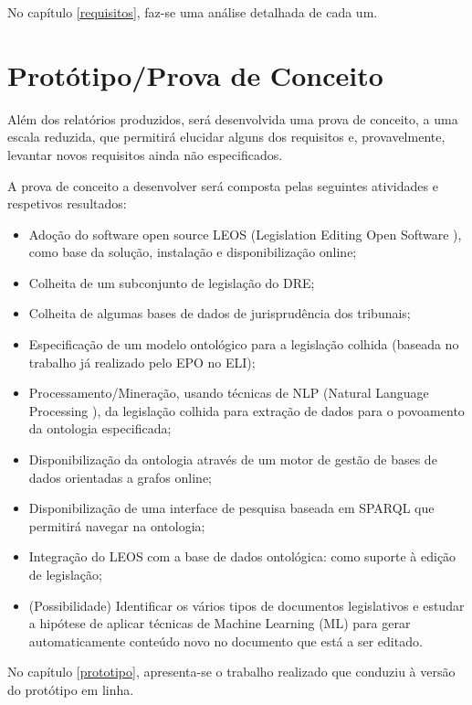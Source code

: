 No capítulo \ref{requisitos}, faz-se uma análise detalhada de cada um.


\section{Protótipo/Prova de Conceito}

Além dos relatórios produzidos, será desenvolvida uma prova de conceito, a uma escala
reduzida, que permitirá elucidar alguns dos requisitos e, provavelmente, levantar novos requisitos ainda
não especificados.

A prova de conceito a desenvolver será composta pelas seguintes atividades e respetivos
resultados:

\begin{itemize}
\item Adoção do software open source LEOS (Legislation Editing Open Software ), como base da
solução, instalação e disponibilização online;
\item Colheita de um subconjunto de legislação do DRE;
\item Colheita de algumas bases de dados de jurisprudência dos tribunais;
\item Especificação de um modelo ontológico para a legislação colhida (baseada no trabalho já
realizado pelo EPO no ELI);
\item Processamento/Mineração, usando técnicas de NLP (Natural Language Processing ), da
legislação colhida para extração de dados para o povoamento da ontologia especificada;
\item Disponibilização da ontologia através de um motor de gestão de bases de dados orientadas a
grafos online;
\item Disponibilização de uma interface de pesquisa baseada em SPARQL que permitirá navegar na
ontologia;
\item Integração do LEOS com a base de dados ontológica: como suporte à edição de legislação;
\item  (Possibilidade) Identificar os vários tipos de documentos legislativos e estudar a hipótese de
aplicar técnicas de Machine Learning (ML) para gerar automaticamente conteúdo novo no
documento que está a ser editado.
\end{itemize}

No capítulo \ref{prototipo}, apresenta-se o trabalho realizado que conduziu à versão do protótipo em linha.
